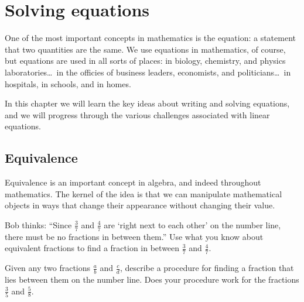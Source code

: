 \chapter{Solving equations}
\label{ch:equations}


One of the most important concepts in mathematics is the equation: a statement that two quantities are the same. We use equations in mathematics, of course, but equations are used in all sorts of places: in biology, chemistry, and physics laboratories\ldots\ in the officies of business leaders, economists, and politicians\ldots\ in hospitals, in schools, and in homes.

In this chapter we will learn the key ideas about writing and solving equations, and we will progress through the various challenges associated with linear equations.

\section{Equivalence}
\label{sec:equivalence}

Equivalence is an important concept in algebra, and indeed throughout mathematics. The kernel of the idea is that we can manipulate mathematical objects in ways that change their appearance without changing their value.

\begin{boxexplore}
Bob thinks: ``Since $\frac{3}{7}$ and $\frac{4}{7}$ are `right next to each other' on the number line, there must be no fractions in between them.'' Use what you know about equivalent fractions to find a fraction in between $\frac{3}{7}$ and $\frac{4}{7}$.

Given any two fractions $\frac{a}{b}$ and $\frac{c}{d}$, describe a procedure for finding a fraction that lies between them on the number line. Does your procedure work for the fractions $\frac{3}{5}$ and $\frac{5}{8}$.
\end{boxexplore} %



